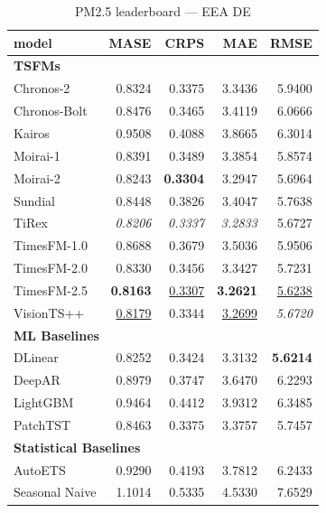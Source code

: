 \begin{table}[H]
\caption{PM2.5 leaderboard --- EEA DE}
\centering
\begin{small}
\begin{tabular}{lrrrr}
\toprule
model & MASE & CRPS & MAE & RMSE \\
\midrule
\multicolumn{5}{l}{\textbf{TSFMs}} \\
Chronos-2 & 0.8324 & 0.3375 & 3.3436 & 5.9400 \\
Chronos-Bolt & 0.8476 & 0.3465 & 3.4119 & 6.0666 \\
Kairos & 0.9508 & 0.4088 & 3.8665 & 6.3014 \\
Moirai-1 & 0.8391 & 0.3489 & 3.3854 & 5.8574 \\
Moirai-2 & 0.8243 & \textbf{0.3304} & 3.2947 & 5.6964 \\
Sundial & 0.8448 & 0.3826 & 3.4047 & 5.7638 \\
TiRex & \textit{0.8206} & \textit{0.3337} & \textit{3.2833} & 5.6727 \\
TimesFM-1.0 & 0.8688 & 0.3679 & 3.5036 & 5.9506 \\
TimesFM-2.0 & 0.8330 & 0.3456 & 3.3427 & 5.7231 \\
TimesFM-2.5 & \textbf{0.8163} & \underline{0.3307} & \textbf{3.2621} & \underline{5.6238} \\
VisionTS++ & \underline{0.8179} & 0.3344 & \underline{3.2699} & \textit{5.6720} \\
\midrule
\multicolumn{5}{l}{\textbf{ML Baselines}} \\
DLinear & 0.8252 & 0.3424 & 3.3132 & \textbf{5.6214} \\
DeepAR & 0.8979 & 0.3747 & 3.6470 & 6.2293 \\
LightGBM & 0.9464 & 0.4412 & 3.9312 & 6.3485 \\
PatchTST & 0.8463 & 0.3375 & 3.3757 & 5.7457 \\
\midrule
\multicolumn{5}{l}{\textbf{Statistical Baselines}} \\
AutoETS & 0.9290 & 0.4193 & 3.7812 & 6.2433 \\
Seasonal Naive & 1.1014 & 0.5335 & 4.5330 & 7.6529 \\
\bottomrule
\end{tabular}
\end{small}
\end{table}